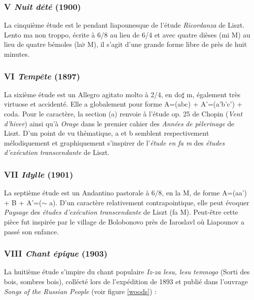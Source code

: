 \subsubsection{V \emph{Nuit dété} (1900)}

La cinquième étude est le pendant liapounesque de l'étude \emph{Ricordanza} de Liszt. Lento ma non troppo, écrite à 6/8 au lieu de 6/4 et avec quatre dièses (mi M) au lieu de quatre bémoles (la$\flat$ M), il s'agit d'une grande forme libre de près de huit minutes.

\subsubsection{VI \emph{Tempête} (1897)}

La sixième étude est un Allegro agitato molto à 2/4, en do$\sharp$ m, également très virtuose et accidenté. Elle a globalement pour forme A=(abc) + A'=(a'b'c') + coda. Pour le caractère, la section (a) renvoie à l'étude  op. 25 de Chopin (\emph{Vent d'hiver}) ainsi qu'à \emph{Orage} dans le premier cahier des \emph{Années de pèlerinage} de Liszt. D'un point de vu thématique, a et b semblent respectivement mélodiquement et graphiquement s'inspirer de l'\emph{étude en fa m} des \emph{études d'exécution transcendante} de Liszt.

\subsubsection{VII \emph{Idylle} (1901)}

La septième étude est un Andantino pastorale à 6/8, en la M, de forme A=(aa') + B + A'=($\sim$ a). D'un caractère relativement contrapointique, elle peut évoquer \emph{Paysage} des \emph{études d'exécution transcendante} de Liszt (fa M). Peut-être cette pièce fut inspirée par le village de Bolobonovo près de Iaroslavl où Liapounov a passé son enfance.

\subsubsection{VIII \emph{Chant épique} (1903)}

La huitième étude s'impire du chant populaire \emph{Iz-za lesu, lesu temnogo} (Sorti des bois, sombres bois), collécté lors de l'expédition de 1893 et publié dans l'ouvrage \emph{Songs of the Russian People} (voir figure \ref{woods}) :\\

